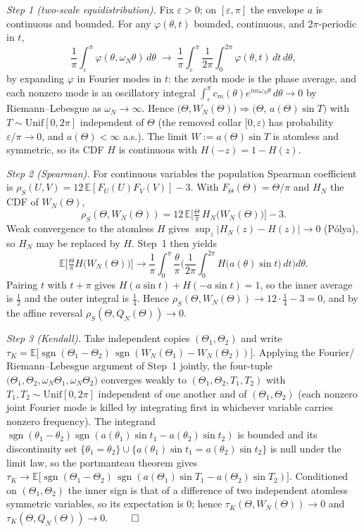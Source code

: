 \documentclass[review,supplement]{siamart220329}
\begin{document}
\emph{Step 1 (two-scale equidistribution).} Fix $\varepsilon>0$; on
$[\varepsilon,\pi]$ the envelope $a$ is continuous and bounded. For any
$\varphi(\theta,t)$ bounded, continuous, and $2\pi$-periodic in $t$,
\[
\frac1\pi\int_\varepsilon^\pi \varphi(\theta,\omega_N\theta)\,d\theta
\;\longrightarrow\;
\frac1\pi\int_\varepsilon^\pi \frac1{2\pi}\int_0^{2\pi}\varphi(\theta,t)\,dt\,d\theta ,
\]
by expanding $\varphi$ in Fourier modes in $t$: the zeroth mode is the phase
average, and each nonzero mode is an oscillatory integral $\int_\varepsilon^\pi
c_m(\theta)e^{im\omega_N\theta}\,d\theta\to0$ by Riemann--Lebesgue as
$\omega_N\to\infty$. Hence $\big(\Theta,W_N(\Theta)\big)\Rightarrow
\big(\Theta,\,a(\Theta)\sin T\big)$ with $T\sim\mathrm{Unif}[0,2\pi]$ independent
of $\Theta$ (the removed collar $[0,\varepsilon)$ has probability
$\varepsilon/\pi\to0$, and $a(\Theta)<\infty$ a.s.). The limit $W:=a(\Theta)\sin T$
is atomless and symmetric, so its CDF $H$ is continuous with $H(-z)=1-H(z)$.

\emph{Step 2 (Spearman).} For continuous variables the population Spearman
coefficient is $\rho_S(U,V)=12\,\mathbb E[F_U(U)F_V(V)]-3$. With
$F_\Theta(\Theta)=\Theta/\pi$ and $H_N$ the CDF of $W_N(\Theta)$,
\[
\rho_S(\Theta,W_N(\Theta))=12\,\mathbb E\!\Big[\tfrac{\Theta}{\pi}\,H_N\big(W_N(\Theta)\big)\Big]-3 .
\]
Weak convergence to the atomless $H$ gives $\sup_z\lvert H_N(z)-H(z)\rvert\to0$
(P\'olya), so $H_N$ may be replaced by $H$. Step~1 then yields
\[
\mathbb E\!\Big[\tfrac{\Theta}{\pi}H\big(W_N(\Theta)\big)\Big]
\longrightarrow
\frac1\pi\int_0^\pi\frac{\theta}{\pi}\Big(\frac1{2\pi}\int_0^{2\pi}H\big(a(\theta)\sin t\big)\,dt\Big)d\theta .
\]
Pairing $t$ with $t+\pi$ gives $H(a\sin t)+H(-a\sin t)=1$, so the inner average is
$\tfrac12$ and the outer integral is $\tfrac14$. Hence
$\rho_S(\Theta,W_N(\Theta))\to12\cdot\tfrac14-3=0$, and by the affine reversal
$\rho_S(\Theta,Q_N(\Theta))\to0$.

\emph{Step 3 (Kendall).} Take independent copies $(\Theta_1,\Theta_2)$ and write
$\tau_K=\mathbb E\big[\operatorname{sgn}(\Theta_1-\Theta_2)\,
\operatorname{sgn}(W_N(\Theta_1)-W_N(\Theta_2))\big]$. Applying the Fourier/%
Riemann--Lebesgue argument of Step~1 jointly, the four-tuple
$\big(\Theta_1,\Theta_2,\omega_N\Theta_1,\omega_N\Theta_2\big)$ converges weakly to
$(\Theta_1,\Theta_2,T_1,T_2)$ with $T_1,T_2\sim\mathrm{Unif}[0,2\pi]$ independent of
one another and of $(\Theta_1,\Theta_2)$ (each nonzero joint Fourier mode is killed
by integrating first in whichever variable carries nonzero frequency). The
integrand $\operatorname{sgn}(\theta_1-\theta_2)\operatorname{sgn}(a(\theta_1)\sin
t_1-a(\theta_2)\sin t_2)$ is bounded and its discontinuity set
$\{\theta_1=\theta_2\}\cup\{a(\theta_1)\sin t_1=a(\theta_2)\sin t_2\}$ is null under
the limit law, so the portmanteau theorem gives
$\tau_K\to\mathbb E\big[\operatorname{sgn}(\Theta_1-\Theta_2)\,
\operatorname{sgn}(a(\Theta_1)\sin T_1-a(\Theta_2)\sin T_2)\big]$. Conditioned on
$(\Theta_1,\Theta_2)$ the inner sign is that of a difference of two independent
atomless symmetric variables, so its expectation is $0$; hence
$\tau_K(\Theta,W_N(\Theta))\to0$ and $\tau_K(\Theta,Q_N(\Theta))\to0$.
\hfill$\qed$
\end{document}
